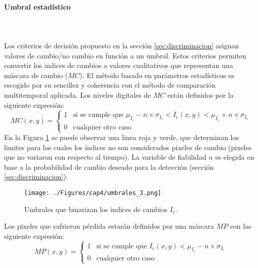 \paragraph{Umbral estad\'istico} \label{sec:umbralEstadistico2}\mbox{}\\\mbox{}\\
Los criterios de decisi\'on propuesto en la secci\'on \ref{sec:discriminacion} asignan valores de cambio/no cambio en funci\'on a un umbral. Estos criterios permiten convertir los indices de cambios a valores cualitativos que representan una m\'ascara de cambio ($ MC $). El m\'etodo basado en par\'ametros estad\'isticos es escogido por su sencillez y coherencia con el m\'etodo de comparaci\'on multitemporal aplicada. Los niveles digitales de $ MC $ est\'an definidos por la siguiente expresi\'on:
\begin{equation}\label{ec:umbMetodo}
MC(x,y) = \begin{cases}
1 & \text{si se cumple que } \mu_{I_{c}} - n \times \sigma_{I_{c}} < I_{c}(x,y) < \mu_{I_{c}} + n \times \sigma_{I_{c}}\\
0 & \text{cualquier otro caso}  
\end{cases}
\end{equation}
En la Figura \ref{fig:umbrales} se puede observar una linea roja y verde, que determinan los limites para los cuales los \'indices no son considerados pixeles de cambio (pixeles que no variaron con respecto al tiempo). La variable de fiabilidad $ n $ es elegida en base a la probabilidad de cambio deseado para la detecci\'on (secci\'on \ref{sec:discriminacion}).
	\begin{figure}[H]
		\centering
		\texttt{[image: ./Figures/cap4/umbrales\_3.png]}
		\caption{Umbrales que binarizan los indices de cambios $ I_{c} $.}
		\label{fig:umbrales}
	\end{figure}
Los pixeles que sufrieron p\'erdida estar\'an definidos por una m\'ascara $ MP $ con las siguiente expresi\'on:
\begin{equation}\label{ec:umbMetodoMP}
MP(x,y) = \begin{cases}
1 & \text{si se cumple que } I_{c}(x,y) < \mu_{I_{c}} - n \times \sigma_{I_{c}} \\
0 & \text{cualquier otro caso}  
\end{cases}
\end{equation}
